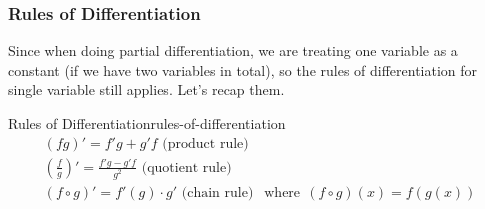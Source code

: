 \documentclass[math,code]{amznotes}
\theoremstyle{remark}
\begin{document}
\subsubsection{Rules of Differentiation}
Since when doing partial differentiation, we are treating one variable as a constant (if we have two variables in total), so the rules of differentiation for single variable still applies. Let's recap them.
\begin{thmbox}{Rules of Differentiation}{rules-of-differentiation}
    \begin{gather*}
        (fg)' = f'g+g'f \text{ (product rule)} \\
        (\frac{f}{g})'=\frac{f'g-g'f}{g^2} \text{ (quotient rule)} \\
        (f \circ g)' = f'(g) \cdot g' \text{ (chain rule) } ~~\text{where}~~ (f \circ g)(x) = f(g(x)) 
    \end{gather*}
\end{thmbox}
\end{document}
